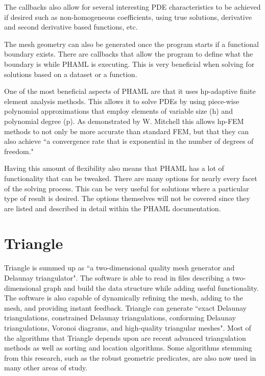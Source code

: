 The callbacks also allow for several interesting PDE characteristics to be achieved if desired such as non-homogeneous coefficients, using true solutions, derivative and second derivative based functions, etc.

The mesh geometry can also be generated once the program starts if a functional boundary exists.  There are callbacks that allow the program to define what the boundary is while PHAML is executing.  This is very beneficial when solving for solutions based on a dataset or a function.

One of the most beneficial aspects of PHAML are that it uses hp-adaptive finite element analysis methods.  This allows it to solve PDEs by using piece-wise polynomial approximations that employ elements of variable size (h) and polynomial degree (p). As demonstrated by W. Mitchell this allows hp-FEM methods to not only be more accurate than standard FEM, but that they can also achieve ``a convergence rate that is exponential in the number of degrees of freedom." \citep{mitchell:hp}

Having this amount of flexibility also means that PHAML has a lot of functionality that can be tweaked.  There are many options for nearly every facet of the solving process.  This can be very useful for solutions where a particular type of result is desired.  The options themselves will not be covered since they are listed and described in detail within the PHAML documentation.\citep{phamldoc}



\section{Triangle}\label{sec:chp2triangle}

Triangle is summed up as ``a two-dimensional quality mesh generator and Delaunay triangulator".\citep{shewchuk96b}  The software is able to read in files describing a two-dimensional graph and build the data structure while adding useful functionality.  The software is also capable of dynamically refining the mesh, adding to the mesh, and providing instant feedback.  Triangle can generate ``exact Delaunay triangulations, constrained Delaunay triangulations, conforming Delaunay triangulations, Voronoi diagrams, and high-quality triangular meshes". \citep{Triangle:website} Most of the algorithms that Triangle depends upon are recent advanced triangulation methods as well as sorting and location algorithms.  Some algorithms stemming from this research, such as the robust geometric predicates, are also now used in many other areas of study. \citep{shewchuk97a}

